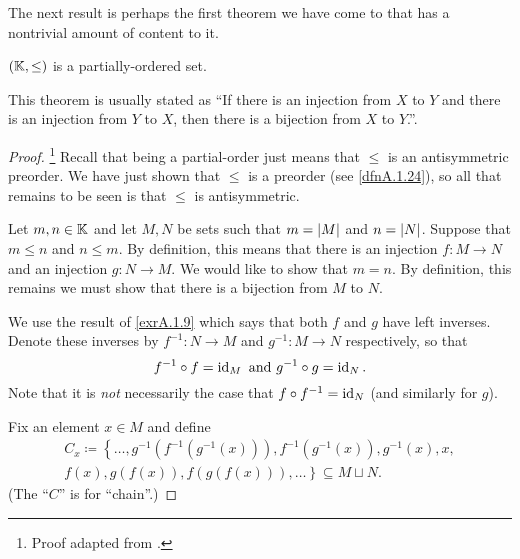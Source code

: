 The next result is perhaps the first theorem we have come to that has a nontrivial amount of content to it.
\begin{thm}\label{thm1.1.26}
$(\mathbb{K} ,\leq )$ is a partially-ordered set.
\begin{rmk}
This theorem is usually stated as ``If there is an injection from $X$ to $Y$ and there is an injection from $Y$ to $X$, then there is a bijection from $X$ to $Y$.''.
\end{rmk}
\begin{proof}\footnote{Proof adapted from \cite[pg.~29]{Abbott}.}
Recall that being a partial-order just means that $\leq$ is an antisymmetric preorder.  We have just shown that $\leq$ is a preorder (see \cref{dfnA.1.24}), so all that remains to be seen is that $\leq$ is antisymmetric.

Let $m,n\in \mathbb{K}$ and let $M,N$ be sets such that $m=\lvert M\rvert$ and $n=\lvert N\rvert$.  Suppose that $m\leq n$ and $n\leq m$.  By definition, this means that there is an injection $f:M\rightarrow N$ and an injection $g:N\rightarrow M$.  We would like to show that $m=n$.  By definition, this remains we must show that there is a bijection from $M$ to $N$.

We use the result of \cref{exrA.1.9} which says that both $f$ and $g$ have left inverses.  Denote these inverses by $f^{-1}:N\rightarrow M$ and $g^{-1}:M\rightarrow N$ respectively, so that
\begin{equation}
f^{-1}\circ f=\operatorname{id} _M\text{ and }g^{-1}\circ g=\operatorname{id} _N.
\end{equation}
Note that it is \emph{not} necessarily the case that $f\circ f^{-1}=\operatorname{id} _N$ (and similarly for $g$).

Fix an element $x\in M$ and define
\begin{equation}\label{1.1.26}
\begin{multlined}
C_x\coloneqq \left\{ \ldots ,g^{-1}\left( f^{-1}\left( g^{-1}(x)\right) \right) ,f^{-1}\left( g^{-1}(x)\right) ,g^{-1}(x),x, \right. \\ \left. f(x),g\left( f(x)\right) ,f\left( g\left( f(x)\right) \right) ,\ldots \right\} \subseteq M\sqcup N.
\end{multlined}
\end{equation}
(The ``$C$'' is for ``chain''.)


\end{proof}
\end{thm}
